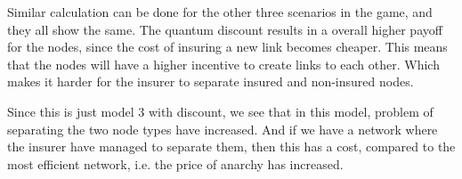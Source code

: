 Similar calculation can be done for the other three scenarios in the game, and they all show the same. The quantum discount results in a overall higher payoff for the nodes, since the cost of insuring a new link becomes cheaper. This means that the nodes will have a higher incentive to create links to each other. Which makes it harder for the insurer to separate insured and non-insured nodes.

Since this is just model 3 with discount, we see that in this model, problem of separating the two node types have increased. And if we have a network where the insurer have managed to separate them, then this has a cost, compared to the most efficient network, i.e. the price of anarchy has increased.







